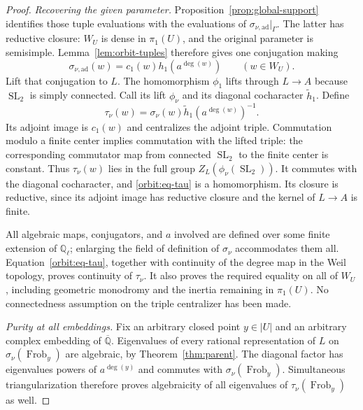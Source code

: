 \documentclass[11pt]{article}
\numberwithin{equation}{section}
\theoremstyle{definition}
\theoremstyle{remark}
\newcommand{\Q}{\mathbb Q}
\newcommand{\Frob}{\operatorname{Frob}}
\newcommand{\SL}{\operatorname{SL}}
\begin{document}
\begin{proof}
\emph{Recovering the given parameter.}
Proposition~\ref{prop:global-support} identifies those tuple
evaluations with the evaluations of
$\sigma_{\nu,\mathrm{ad}}|_\Gamma$.  The latter has reductive
closure: $W_U$ is dense in $\pi_1(U)$, and the original parameter
is semisimple.  Lemma~\ref{lem:orbit-tuples} therefore gives one
conjugation making
\[
             \sigma_{\nu,\mathrm{ad}}(w)
                       =c_1(w)h_1(a^{\deg(w)})
                            \qquad(w\in W_U).
\]
Lift that conjugation to $L$.  The homomorphism $\phi_1$ lifts
through $L\to A$ because $\SL_2$ is simply connected.  Call its
lift $\phi_\nu$ and its diagonal cocharacter $\widetilde h_1$.
Define
\begin{equation}\label{orbit:eq-tau}
       \tau_\nu(w)=\sigma_\nu(w)
                         \widetilde h_1(a^{\deg(w)})^{-1}.
\end{equation}
Its adjoint image is $c_1(w)$ and centralizes the adjoint triple.
Commutation modulo a finite center implies commutation with the
lifted triple: the corresponding commutator map from connected
$\SL_2$ to the finite center is constant.  Thus $\tau_\nu(w)$
lies in the full group $Z_L(\phi_\nu(\SL_2))$.  It commutes
with the diagonal cocharacter, and \eqref{orbit:eq-tau} is a
homomorphism.  Its closure is reductive, since its adjoint image
has reductive closure and the kernel of $L\to A$ is finite.

All algebraic maps, conjugators, and $a$ involved are defined over
some finite extension of $\Q_\ell$; enlarging the field of
definition of $\sigma_\nu$ accommodates them all.
Equation~\eqref{orbit:eq-tau}, together with continuity of the
degree map in the Weil topology, proves continuity of $\tau_\nu$.
It also proves the required equality on all of $W_U$, including
geometric monodromy and the inertia remaining in $\pi_1(U)$.
No connectedness assumption on the triple centralizer has been made.

\emph{Purity at all embeddings.}
Fix an arbitrary closed point $y\in |U|$ and an arbitrary complex
embedding of $\overline{\Q}$.  Eigenvalues of every rational
representation of $L$ on $\sigma_\nu(\Frob_y)$ are algebraic,
by Theorem~\ref{thm:parent}.  The diagonal factor has eigenvalues
powers of $a^{\deg(y)}$ and commutes with $\sigma_\nu(\Frob_y)$.
Simultaneous triangularization therefore proves algebraicity of
all eigenvalues of $\tau_\nu(\Frob_y)$ as well.


\end{proof}
\end{document}
